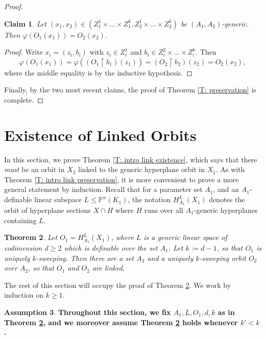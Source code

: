\documentclass{amsart}
\newtheorem{theorem}{Theorem}[section]
\newtheorem{claim}[theorem]{Claim}
\theoremstyle{definition}
\newtheorem{assumption}[theorem]{Assumption}
\begin{document}
\begin{proof}
    \begin{claim} Let $(x_1,x_2)\in(Z_1^1\times...\times Z_1^k,Z_2^1\times...\times Z_2^k)$ be $(A_1,A_2)$-generic. Then $\varphi(O_1(x_1))=O_2(x_2)$.
    \end{claim}
    \begin{proof}
        Write $x_i=(z_i,b_i)$ with $z_i\in Z_i^1$ and $b_i\in Z_i^2\times...\times Z_i^k$. Then $$\varphi(O_1(x_1))=\varphi((O_1\restriction b_1)(z_1))=(O_2\restriction b_2)(z_2)=O_2(x_2),$$ where the middle equality is by the inductive hypothesis.
    \end{proof}

    Finally, by the two most recent claims, the proof of Theorem \ref{T: preservation} is complete.
\end{proof}


\section{Existence of Linked Orbits}

In this section, we prove Theorem \ref{T: intro link existence}, which says that there \textit{must} be an orbit in $X_2$ linked to the generic hyperplane orbit in $X_1$. As with Theorem \ref{T: intro link preservation}, it is more convenient to prove a more general statement by induction. Recall that for a parameter set $A_1$, and an $A_1$-definable linear subspace $L\leq\mathbb P^n(K_1)$, the notation $H_{A_1}^L(X_1)$ denotes the orbit of hyperplane sections $X\cap H$ where $H$ runs over all $A_1$-generic hyperplanes containing $L$.

\begin{theorem}\label{T: existence of linked orbits}
    Let $O_1=H_{A_1}^L(X_1)$, where $L$ is a generic linear space of codimension $d\geq 2$ which is definable over the set $A_1$. Let $k:=d-1$, so that $O_1$ is uniquely $k$-sweeping. Then there are a set $A_2$ and a uniquely $k$-sweeping orbit $O_2$ over $A_2$, so that $O_1$ and $O_2$ are linked.
\end{theorem}

The rest of this section will occupy the proof of Theorem \ref{T: existence of linked orbits}. We work by induction on $k\geq 1$.

\begin{assumption} \textbf{Throughout this section, we fix $A_1,L,O_1,d,k$ as in Theorem \ref{T: existence of linked orbits}, and we moreover assume Theorem \ref{T: existence of linked orbits} holds whenever $k'<k$.}
\end{assumption}
\end{document}
